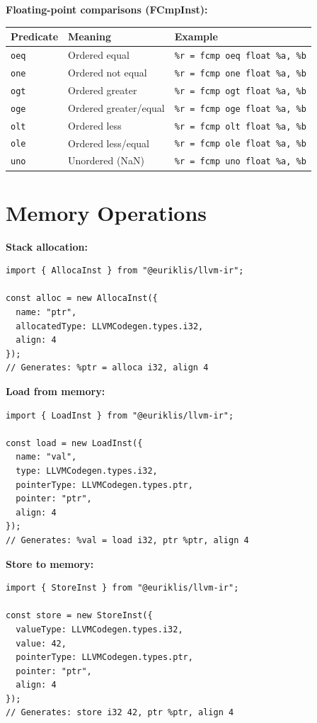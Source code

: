 \documentclass[11pt,oneside]{book}
\begin{document}
\textbf{Floating-point comparisons (FCmpInst):}
\begin{longtable}{|p{2.5cm}|p{3cm}|p{7cm}|}
\hline
\textbf{Predicate} & \textbf{Meaning} & \textbf{Example} \\
\hline
\texttt{oeq} & Ordered equal & \texttt{\%r = fcmp oeq float \%a, \%b} \\
\hline
\texttt{one} & Ordered not equal & \texttt{\%r = fcmp one float \%a, \%b} \\
\hline
\texttt{ogt} & Ordered greater & \texttt{\%r = fcmp ogt float \%a, \%b} \\
\hline
\texttt{oge} & Ordered greater/equal & \texttt{\%r = fcmp oge float \%a, \%b} \\
\hline
\texttt{olt} & Ordered less & \texttt{\%r = fcmp olt float \%a, \%b} \\
\hline
\texttt{ole} & Ordered less/equal & \texttt{\%r = fcmp ole float \%a, \%b} \\
\hline
\texttt{uno} & Unordered (NaN) & \texttt{\%r = fcmp uno float \%a, \%b} \\
\hline
\end{longtable}

\section{Memory Operations}

\textbf{Stack allocation:}
\begin{lstlisting}[style=ts]
import { AllocaInst } from "@euriklis/llvm-ir";

const alloc = new AllocaInst({
  name: "ptr",
  allocatedType: LLVMCodegen.types.i32,
  align: 4
});
// Generates: %ptr = alloca i32, align 4
\end{lstlisting}

\textbf{Load from memory:}
\begin{lstlisting}[style=ts]
import { LoadInst } from "@euriklis/llvm-ir";

const load = new LoadInst({
  name: "val",
  type: LLVMCodegen.types.i32,
  pointerType: LLVMCodegen.types.ptr,
  pointer: "ptr",
  align: 4
});
// Generates: %val = load i32, ptr %ptr, align 4
\end{lstlisting}

\textbf{Store to memory:}
\begin{lstlisting}[style=ts]
import { StoreInst } from "@euriklis/llvm-ir";

const store = new StoreInst({
  valueType: LLVMCodegen.types.i32,
  value: 42,
  pointerType: LLVMCodegen.types.ptr,
  pointer: "ptr",
  align: 4
});
// Generates: store i32 42, ptr %ptr, align 4
\end{lstlisting}
\end{document}
